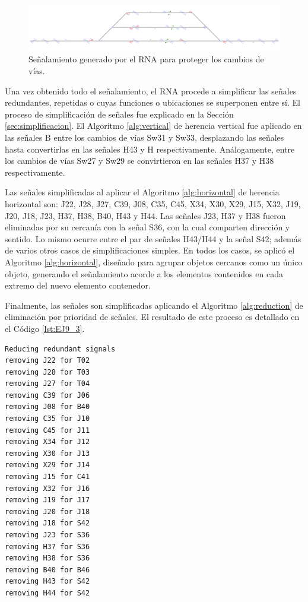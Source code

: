 	\begin{figure}[H]
		\centering
		\includegraphics[width=1\textwidth]{resultados-obtenidos/ejemplo9/images/9_step4.png}
		\centering\caption{Señalamiento generado por el RNA para proteger los cambios de vías.}
		\label{fig:EJ9_6}
	\end{figure}

	Una vez obtenido todo el señalamiento, el RNA procede a simplificar las señales redundantes, repetidas o cuyas funciones o ubicaciones se superponen entre sí. El proceso de simplificación de señales fue explicado en la Sección \ref{sec:simplificacion}. El Algoritmo \ref{alg:vertical} de herencia vertical fue aplicado en las señales B entre los cambios de vías Sw31 y Sw33, desplazando las señales hasta convertirlas en las señales H43 y H respectivamente. Análogamente, entre los cambios de vías Sw27 y Sw29 se convirtieron en las señales H37 y H38 respectivamente.
	
	Las señales simplificadas al aplicar el Algoritmo \ref{alg:horizontal} de herencia horizontal son: J22, J28, J27, C39, J08, C35, C45, X34, X30, X29, J15, X32, J19, J20, J18, J23, H37, H38, B40, H43 y H44. Las señales J23, H37 y H38 fueron eliminadas por su cercanía con la señal S36, con la cual comparten dirección y sentido. Lo mismo ocurre entre el par de señales H43/H44 y la señal S42; además de varios otros casos de simplificaciones simples. En todos los casos, se aplicó el Algoritmo \ref{alg:horizontal}, diseñado para agrupar objetos cercanos como un único objeto, generando el señalamiento acorde a los elementos contenidos en cada extremo del nuevo elemento contenedor.
	
	Finalmente, las señales son simplificadas aplicando el Algoritmo \ref{alg:reduction} de eliminación por prioridad de señales. El resultado de este proceso es detallado en el Código \ref{lst:EJ9_3}.

	\begin{lstlisting}[language = {}, caption = Reducción de señalamiento por prioridad de señales, label = {lst:EJ9_3}]
Reducing redundant signals
removing J22 for T02
removing J28 for T03
removing J27 for T04
removing C39 for J06
removing J08 for B40
removing C35 for J10
removing C45 for J11
removing X34 for J12
removing X30 for J13
removing X29 for J14
removing J15 for C41
removing X32 for J16
removing J19 for J17
removing J20 for J18
removing J18 for S42
removing J23 for S36
removing H37 for S36
removing H38 for S36
removing B40 for B46
removing H43 for S42
removing H44 for S42
	\end{lstlisting}

